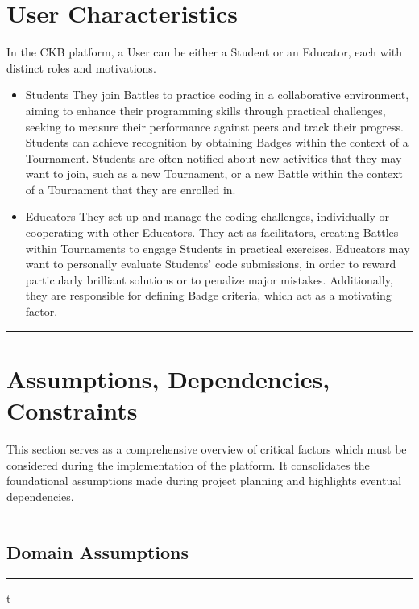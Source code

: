 \documentclass{Configuration_Files/Template}
\begin{document}
\section{User Characteristics}

In the CKB platform, a User can be either a Student or an Educator, each with distinct roles and motivations.

\begin{itemize}
\item \textcolor{bluepoli}{Students} They join Battles to practice coding in a collaborative environment, aiming to enhance their programming skills through practical challenges, seeking to measure their performance against peers and track their progress. Students can achieve recognition by obtaining Badges within the context of a Tournament. Students are often notified about new activities that they may want to join, such as a new Tournament, or a new Battle within the context of a Tournament that they are enrolled in.
\item \textcolor{bluepoli}{Educators} They set up and manage the coding challenges, individually or cooperating with other Educators. They act as facilitators, creating Battles within Tournaments to engage Students in practical exercises. Educators may want to personally evaluate Students' code submissions, in order to reward particularly brilliant solutions or to penalize major mistakes. Additionally, they are responsible for defining Badge criteria, which act as a motivating factor.
\end{itemize}

{\color{bluepoli}\rule{\linewidth}{0.1pt}}

\section{Assumptions, Dependencies, Constraints}

This section serves as a comprehensive overview of critical factors which must be considered during the implementation of the platform. It consolidates the foundational assumptions made during project planning and highlights eventual dependencies.

{\color{bluepoli}\rule{\linewidth}{0.1pt}}

\subsection{Domain Assumptions}

{\color{bluepoli}\rule{\linewidth}{0.1pt}}t
\end{document}

